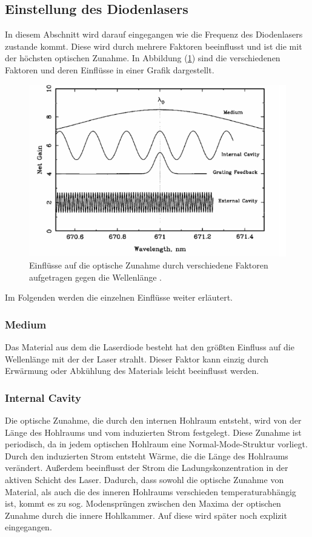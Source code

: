 \subsection{Einstellung des Diodenlasers}
In diesem Abschnitt wird darauf eingegangen wie die Frequenz des Diodenlasers zustande kommt. Diese wird durch mehrere Faktoren beeinflusst und ist die mit der höchsten optischen Zunahme. In Abbildung (\ref{fig:netga}) sind die verschiedenen Faktoren und deren Einflüsse in einer Grafik dargestellt.
\begin{figure}[h!]
  \centering
  \includegraphics[scale=0.7]{fig/netga.png}
  \caption{Einflüsse auf die optische Zunahme durch verschiedene Faktoren aufgetragen gegen die Wellenlänge \cite[6]{Anleitung}.}
  \label{fig:netga}
\end{figure}
\FloatBarrier
\noindent Im Folgenden werden die einzelnen Einflüsse weiter erläutert.
\subsubsection{Medium}
Das Material aus dem die Laserdiode besteht hat den größten Einfluss auf die Wellenlänge mit der der Laser strahlt. Dieser Faktor kann einzig durch Erwärmung oder Abkühlung des Materials leicht
beeinflusst werden.
\subsubsection{Internal Cavity}
Die optische Zunahme, die durch den internen Hohlraum entsteht, wird von der Länge des Hohlraums und vom induzierten Strom festgelegt. Diese Zunahme ist periodisch, da in jedem optischen
Hohlraum eine Normal-Mode-Struktur vorliegt. Durch den induzierten Strom entsteht Wärme, die die Länge des Hohlraums verändert. Außerdem beeinflusst der Strom die Ladungskonzentration in
der aktiven Schicht des Laser. Dadurch, dass sowohl die optische Zunahme von Material, als auch die des inneren Hohlraums verschieden temperaturabhängig ist, kommt es zu sog. Modensprüngen zwischen
den Maxima der optischen Zunahme durch die innere Hohlkammer. Auf diese wird später noch explizit eingegangen.
